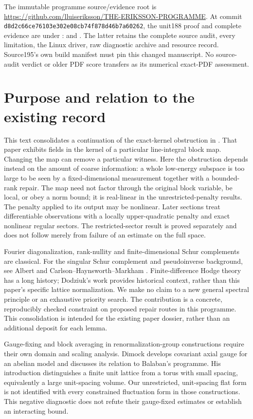 \documentclass[11pt]{article}
\begin{document}
The immutable programme source/evidence root is
\url{https://github.com/lluiseriksson/THE-ERIKSSON-PROGRAMME}.
At commit \texttt{d8d2c66ce76103e302e08cb74f878d46b7a60262}, the unit188 proof and
complete evidence are under :
 and .
The latter retains the complete source audit, every limitation, the Linux driver,
raw diagnostic archive and resource record. Source195's own build manifest must pin
this changed manuscript. No source-audit verdict or older PDF score transfers
as its numerical exact-PDF assessment.
\clearpage


\section{Purpose and relation to the existing record}
This text consolidates a continuation of the exact-kernel obstruction in
\cite{eriksson}. That paper exhibits fields in the kernel of a particular
line-integral block map. Changing the map can remove a particular witness.
Here the obstruction depends instead on the amount of coarse information:
a whole low-energy subspace is too large to be seen by a fixed-dimensional
measurement together with a bounded-rank repair. The map need not factor
through the original block variable, be local, or obey a norm bound; it is
real-linear in the unrestricted-penalty results. The penalty applied to its output may be nonlinear. Later sections treat differentiable observations with a locally upper-quadratic penalty and exact nonlinear regular sectors.
The restricted-sector result is proved separately and does not follow merely
from failure of an estimate on the full space.

Fourier diagonalization, rank-nullity and finite-dimensional Schur complements
are classical. For the singular Schur complement and pseudoinverse background,
see Albert and Carlson--Haynsworth--Markham \cite{albert,carlson}. Finite-difference Hodge theory has a long history; Dodziuk's
work \cite{dodziuk} provides historical context, rather than this paper's
specific lattice normalization. We make no claim to a new general spectral
principle or an exhaustive priority search. The contribution is a concrete,
reproducibly checked constraint on proposed repair routes in this programme.
This consolidation is intended for the existing paper dossier, rather than
an additional deposit for each lemma.

Gauge-fixing and block averaging in renormalization-group constructions
require their own domain and scaling analysis. Dimock \cite{dimock} develops
covariant axial gauge for an abelian model and discusses its relation to
Balaban's programme. His introduction distinguishes a finite unit lattice
from a torus with small spacing, equivalently a large unit-spacing volume.
Our unrestricted, unit-spacing flat form is not identified with every
constrained fluctuation form in those constructions. This negative diagnostic
does not refute their gauge-fixed estimates or establish an interacting bound.
\end{document}
